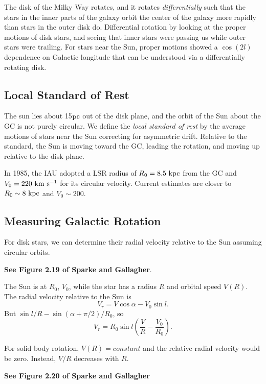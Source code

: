 \documentclass[]{article}
\begin{document}
The disk of the Milky Way rotates, and it rotates {\it differentially}
such that the stars in the inner parts of the galaxy orbit the
center of the galaxy more rapidly than stars in the outer disk do.
Differential rotation by looking at the proper motions of disk
stars, and seeing that inner stars were passing us while
outer stars were trailing. For stars near the Sun, proper
motions showed a $\cos(2l)$ dependence on Galactic longitude that
can be understood via a differentially rotating disk.

\subsection{Local Standard of Rest}

The sun lies about 15$\mathrm{pc}$ out of the disk plane, and the orbit
of the Sun about the GC is not purely circular. We define the
{\it local standard of rest} by the average motions of stars
near the Sun correcting for asymmetric drift. Relative to the
standard, the Sun is moving toward the GC, leading the 
rotation, and moving up relative to the disk plane.

In 1985, the IAU adopted a LSR radius of $R_{0}=8.5~\mathrm{kpc}$ from
the GC and $V_{0}=220~\mathrm{km}~\mathrm{s}^{-1}$ for its circular velocity.
Current estimates are closer to $R_0\sim8~\mathrm{kpc}$ and $V_0 \sim 200$.

\subsection{Measuring Galactic Rotation}

For disk stars, we can determine their radial velocity
relative to the Sun assuming circular orbits.

{\bf See Figure 2.19 of Sparke and Gallagher}.

The Sun is at $R_0$, $V_0$, while the star has a radius $R$
and orbital speed $V(R)$.  The radial velocity relative to
the Sun is
\begin{equation}
V_{r} = V\cos\alpha - V_0 \sin l.
\end{equation}
\noindent
But $\sin l/R - \sin(\alpha + \pi/2)/R_0$, so
\begin{equation}
V_r = R_0 \sin l \left(\frac{V}{R} - \frac{V_0}{R_0}\right).
\end{equation}

For solid body rotation, $V(R)=constant$ and the relative 
radial velocity would be zero. Instead, $V/R$ decreases
with $R$.

{\bf See Figure 2.20 of Sparke and Gallagher}
\end{document}
